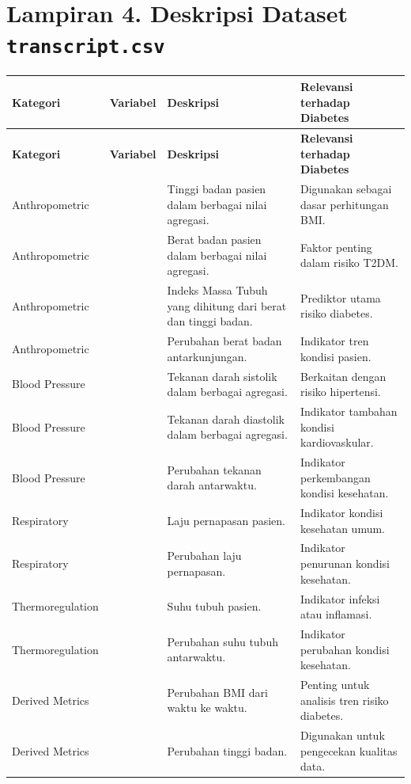 \section*{Lampiran 4. Deskripsi Dataset \texttt{transcript.csv}}
\label{app:transcript}
\scriptsize
\begin{longtable}{|L{2.8cm}|L{4.2cm}|L{3.5cm}|L{2.6cm}|}
\hline
\textbf{Kategori} & \textbf{Variabel} & \textbf{Deskripsi} & \textbf{Relevansi terhadap Diabetes}\\ \hline
\endfirsthead
\hline
\textbf{Kategori} & \textbf{Variabel} & \textbf{Deskripsi} & \textbf{Relevansi terhadap Diabetes}\\ \hline
\endhead
Anthropometric &  & Tinggi badan pasien dalam berbagai nilai agregasi. & Digunakan sebagai dasar perhitungan BMI.\\ \hline
Anthropometric &  & Berat badan pasien dalam berbagai nilai agregasi. & Faktor penting dalam risiko T2DM.\\ \hline
Anthropometric &  & Indeks Massa Tubuh yang dihitung dari berat dan tinggi badan. & Prediktor utama risiko diabetes.\\ \hline
Anthropometric &  & Perubahan berat badan antarkunjungan. & Indikator tren kondisi pasien.\\ \hline
Blood Pressure &  & Tekanan darah sistolik dalam berbagai agregasi. & Berkaitan dengan risiko hipertensi.\\ \hline
Blood Pressure &  & Tekanan darah diastolik dalam berbagai agregasi. & Indikator tambahan kondisi kardiovaskular.\\ \hline
Blood Pressure &  & Perubahan tekanan darah antarwaktu. & Indikator perkembangan kondisi kesehatan.\\ \hline
Respiratory &  & Laju pernapasan pasien. & Indikator kondisi kesehatan umum.\\ \hline
Respiratory &  & Perubahan laju pernapasan. & Indikator penurunan kondisi kesehatan.\\ \hline
Thermoregulation &  & Suhu tubuh pasien. & Indikator infeksi atau inflamasi.\\ \hline
Thermoregulation &  & Perubahan suhu tubuh antarwaktu. & Indikator perubahan kondisi kesehatan.\\ \hline
Derived Metrics &  & Perubahan BMI dari waktu ke waktu. & Penting untuk analisis tren risiko diabetes.\\ \hline
Derived Metrics &  & Perubahan tinggi badan. & Digunakan untuk pengecekan kualitas data.\\ \hline
\end{longtable}
\normalsize

\setlength{\tabcolsep}{6pt}
